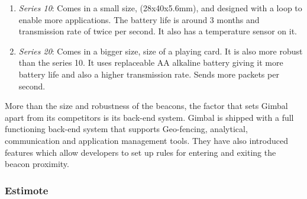 \begin{enumerate}
\item \emph{Series 10}: Comes in a small size, (28x40x5.6mm), and designed with
a loop to enable more applications. The battery life is around
3 months and transmission rate of twice per second. It also has a
temperature sensor on it.
\item \emph{Series 20}: Comes in a bigger size, size of a playing card. It is also
more robust than the series 10. It uses replaceable AA alkaline battery
giving it more battery life and also a higher transmission rate. Sends more packets per second.
\end{enumerate}
More than the size and robustness of the beacons, the factor that
sets Gimbal apart from its competitors is its back-end system. Gimbal
is shipped with a full functioning back-end system that supports Geo-fencing\cite{geofencing},
analytical, communication and application management tools. They have
also introduced features which allow developers to set up rules
for entering and exiting the beacon proximity.


\subsubsection{Estimote}


